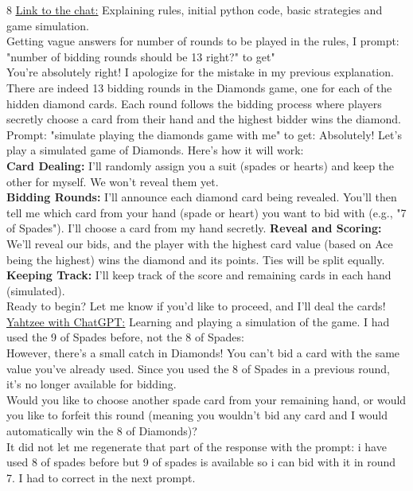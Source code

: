 \documentclass[runningheads]{llncs}
\begin{document}
\begin{thebibliography}{8}
\underline{\href{https://g.co/gemini/share/738320f7e8a6}{Link to the chat:}} Explaining rules, initial python code, basic strategies and game simulation.\\

 Getting vague answers for number of rounds to be played in the rules, I prompt: "number of bidding rounds should be 13 right?" to get"\\
You're absolutely right! I apologize for the mistake in my previous explanation. There are indeed 13 bidding rounds in the Diamonds game, one for each of the hidden diamond cards. Each round follows the bidding process where players secretly choose a card from their hand and the highest bidder wins the diamond.\\

 Prompt: "simulate playing the diamonds game with me" to get:
Absolutely! Let's play a simulated game of Diamonds. Here's how it will work:\\

\textbf{Card Dealing: }I'll randomly assign you a suit (spades or hearts) and keep the other for myself. We won't reveal them yet.\\
\textbf{Bidding Rounds:} I'll announce each diamond card being revealed. You'll then tell me which card from your hand (spade or heart) you want to bid with (e.g., "7 of Spades"). I'll choose a card from my hand secretly.
\textbf{Reveal and Scoring: }We'll reveal our bids, and the player with the highest card value (based on Ace being the highest) wins the diamond and its points. Ties will be split equally.\\
\textbf{Keeping Track:} I'll keep track of the score and remaining cards in each hand (simulated).\\
Ready to begin? Let me know if you'd like to proceed, and I'll deal the cards!\\

\underline{\href{https://chat.openai.com/share/949b3337-f29f-49c7-82a3-78c4bf30ee25}{Yahtzee with ChatGPT:}} Learning and playing a simulation of the game.
 I had used the 9 of Spades before, not the 8 of Spades:\\
However, there's a small catch in Diamonds! You can't bid a card with the same value you've already used. Since you used the 8 of Spades in a previous round, it's no longer available for bidding.
\\
Would you like to choose another spade card from your remaining hand, or would you like to forfeit this round (meaning you wouldn't bid any card and I would automatically win the 8 of Diamonds)?
\\ It did not let me regenerate that part of the response with the prompt: i have used 8 of spades before but 9 of spades is available so i can bid with it in round 7. I had to correct in the next prompt.



\end{thebibliography}
\end{document}
